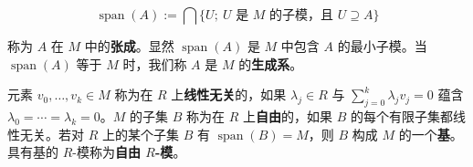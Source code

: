 \begin{example}
\[
\operatorname{span}(A) := \bigcap\{U ; \ U \text{ 是 } M \text{ 的子模，且 } U \supseteq A\}
\]

称为 $ A $ 在 $ M $ 中的\textbf{张成}。显然 $ \operatorname{span}(A) $ 是 $ M $ 中包含 $ A $ 的最小子模。当 $ \operatorname{span}(A) $ 等于 $ M $ 时，我们称 $ A $ 是 $ M $ 的\textbf{生成系}。

元素 $ v_{0},\ldots,v_{k} \in M $ 称为在 $ R $ 上\textbf{线性无关}的，如果 $ \lambda_{j} \in R $ 与 $ \sum_{j=0}^{k}\lambda_{j}v_{j} = 0 $ 蕴含 $ \lambda_{0} = \cdots = \lambda_{k} = 0 $。$ M $ 的子集 $ B $ 称为在 $ R $ 上\textbf{自由}的，如果 $ B $ 的每个有限子集都线性无关。若对 $ R $ 上的某个子集 $ B $ 有 $ \operatorname{span}(B) = M $，则 $ B $ 构成 $ M $ 的一个\textbf{基}。具有基的 $ R $-模称为\textbf{自由 $ R $-模}。

\end{example}

